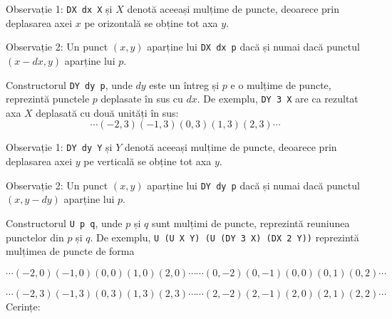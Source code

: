 \documentclass[addpoints,12pt,a4paper]{exam}
\begin{document}
\begin{questions}
Observație 1:  \lstinline$DX dx X$ și $X$ denotă aceeași mulțime de puncte, deoarece prin deplasarea axei $x$ pe orizontală se obține tot axa $y$.

Observație 2: Un punct $(x,y)$ aparține lui \lstinline$DX dx p$ dacă și numai dacă punctul $(x-dx,y)$ aparține lui $p$.

Constructorul \lstinline$DY dy p$, unde $dy$ este un întreg și $p$ e o mulțime de puncte, reprezintă punctele $p$ deplasate în sus cu $dx$. De exemplu, \lstinline$DY 3 X$ are ca rezultat axa $X$ deplasată cu două unități în sus:
$$\cdots (-2,3) (-1,3) (0,3) (1,3) (2,3) \cdots$$

Observație 1:  \lstinline$DY dy Y$ și $Y$ denotă aceeași mulțime de puncte, deoarece prin deplasarea axei $y$ pe verticală se obține tot axa $y$.

Observație 2: Un punct $(x,y)$ aparține lui \lstinline$DY dy p$ dacă și numai dacă punctul $(x,y-dy)$ aparține lui $p$.

Constructorul \lstinline$U p q$, unde $p$ și $q$ sunt mulțimi de puncte, reprezintă reuniunea punctelor din $p$ și $q$.  De exemplu,
\lstinline$U (U X Y) (U (DY 3 X) (DX 2 Y))$
reprezintă mulțimea de puncte de forma

$\cdots (-2,0) (-1,0) (0,0) (1,0) (2,0) \cdots
\cdots (0,-2) (0,-1) (0,0) (0,1) (0,2) \cdots$

\hfill$\cdots (-2,3) (-1,3) (0,3) (1,3) (2,3) \cdots
\cdots (2,-2) (2,-1) (2,0) (2,1) (2,2) \cdots
$
\newpage
Cerințe:
\end{questions}
\end{document}
